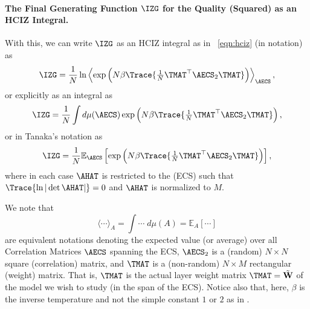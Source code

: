 \paragraph{The Final Generating Function $\IZG$ for the Quality (Squared) as an HCIZ Integral.}

With this, we can write $\IZG$ as an HCIZ integral as in \EQN~\ref{eqn:hciz}
(in \BraKet notation) as
\begin{align}
  \label{eqn:IZG_final_hciz}
  \IZG = \frac{1}{N} \ln\left\langle \exp\left( N\beta \Trace{ \tfrac{1}{N} \TMAT^{\top}\AECS_{2}\TMAT } \right)\right\rangle_{\AECS}  ,
\end{align}
or explicitly as an integral as
\begin{align}
  \label{eqn:IZG_final_integral}
 \IZG  = \frac{1}{N}\int d\mu(\AECS) \exp \left( N\beta \Trace{ \tfrac{1}{N} \TMAT^{\top}\AECS_{2}\TMAT } \right)  ,
\end{align}
or in Tanaka's notation as
\begin{align}
  \label{eqn:IZG_final_tanaka}
 \IZG  = \frac{1}{N}\mathbb{E}_{\AECS}\left[ \exp \left( N\beta \Trace{ \tfrac{1}{N} \TMAT^{\top}\AECS_{2}\TMAT } \right)\right]  ,
\end{align}
where in each case $\AHAT$ is restricted to the \EffectiveCorrelationSpace (ECS) 
such that $\Trace{\ln|\det\AHAT|}=0$ and $\AHAT$ is normalized to $M$.

We note that
$$ \langle\cdots\rangle_{A} = \int \cdots \; d\mu(A) = \mathbb{E}_{A}[\cdots] $$
are equivalent notations denoting the expected value (or average) over all \Student Correlation Matrices $\AECS$ spanning the ECS,
$\AECS_{2}$ is a (random) $N\times N$ square (correlation) matrix, and
$\TMAT$ is a (non-random) \Teacher $N\times M$ rectangular (weight) matrix.
That is, $\TMAT$ is the actual layer weight matrix $\TMAT=\tilde{\mathbf{W}}$ of the model we wish to study
(in the span of the ECS).
Notice also that, here, $\beta$ is the inverse temperature and not the simple constant $1$ or $2$ as in \cite{Tanaka}.
